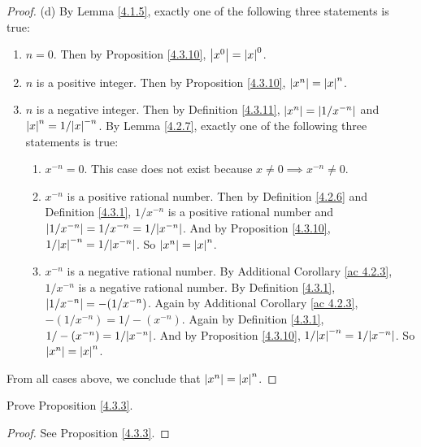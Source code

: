 \begin{proof}{(d)}
By Lemma \ref{4.1.5}, exactly one of the following three statements is true:
\begin{enumerate}[label=(\Roman*)]
    \item \(n = 0\).
    Then by Proposition \ref{4.3.10}, \(\abs*{x^0} = \abs*{x}^0\).
    \item \(n\) is a positive integer.
    Then by Proposition \ref{4.3.10}, \(\abs*{x^n} = \abs*{x}^n\).
    \item \(n\) is a negative integer.
    Then by Definition \ref{4.3.11}, \(\abs*{x^n} = \abs*{1 / x^{-n}}\) and \(\abs*{x}^n = 1 / \abs*{x}^{-n}\).
    By Lemma \ref{4.2.7}, exactly one of the following three statements is true:
    \begin{enumerate}[label=(\roman*)]
        \item \(x^{-n} = 0\).
        This case does not exist because \(x \neq 0 \implies x^{-n} \neq 0\).
        \item \(x^{-n}\) is a positive rational number.
        Then by Definition \ref{4.2.6} and Definition \ref{4.3.1}, \(1 / x^{-n}\) is a positive rational number and \(\abs*{1 / x^{-n}} = 1 / x^{-n} = 1 / \abs*{x^{-n}}\).
        And by Proposition \ref{4.3.10}, \(1 / \abs*{x}^{-n} = 1 / \abs*{x^{-n}}\).
        So \(\abs*{x^n} = \abs*{x}^n\).
        \item \(x^{-n}\) is a negative rational number.
        By Additional Corollary \ref{ac 4.2.3}, \(1 / x^{-n}\) is a negative rational number.
        By Definition \ref{4.3.1}, \(\abs*{1 / x^{-n}} = -(1 / x^{-n})\).
        Again by Additional Corollary \ref{ac 4.2.3}, \(-(1 / x^{-n}) = 1 / -(x^{-n})\).
        Again by Definition \ref{4.3.1}, \(1 / -(x^{-n}) = 1 / \abs*{x^{-n}}\).
        And by Proposition \ref{4.3.10}, \(1 / \abs*{x}^{-n} = 1 / \abs*{x^{-n}}\).
        So \(\abs*{x^n} = \abs*{x}^n\).
    \end{enumerate}
\end{enumerate}
From all cases above, we conclude that \(\abs*{x^n} = \abs*{x}^n\).
\end{proof}

\exercisesection

\begin{exercise}\label{ex 4.3.1}
Prove Proposition \ref{4.3.3}.
\end{exercise}

\begin{proof}
See Proposition \ref{4.3.3}.
\end{proof}

